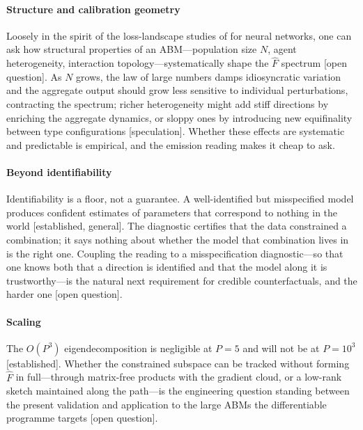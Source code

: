 \documentclass[10pt,twocolumn]{article}
\newcommand{\Fhat}{\hat{F}}
\newcommand{\est}[1]{\textup{\textsf{\footnotesize[#1]}}}
\begin{document}
\paragraph{Structure and calibration geometry}
Loosely in the spirit of the loss-landscape studies of \citet{li2018visualizing} for
neural networks, one can ask how structural properties of an ABM---population size
$N$, agent heterogeneity, interaction topology---systematically shape the $\Fhat$
spectrum \est{open question}. As $N$ grows, the law of large numbers damps
idiosyncratic variation and the aggregate output should grow less sensitive to
individual perturbations, contracting the spectrum; richer heterogeneity might add
stiff directions by enriching the aggregate dynamics, or sloppy ones by introducing
new equifinality between type configurations \est{speculation}. Whether these effects
are systematic and predictable is empirical, and the emission reading makes it cheap
to ask.

\paragraph{Beyond identifiability}
Identifiability is a floor, not a guarantee. A well-identified but misspecified model
produces confident estimates of parameters that correspond to nothing in the world
\est{established, general}. The diagnostic certifies that the data constrained a
combination; it says nothing about whether the model that combination lives in is the
right one. Coupling the reading to a misspecification diagnostic---so that one knows
both that a direction is identified and that the model along it is trustworthy---is
the natural next requirement for credible counterfactuals, and the harder one \est{open
question}.

\paragraph{Scaling}
The $O(P^3)$ eigendecomposition is negligible at $P=5$ and will not be at $P=10^3$
\est{established}. Whether the constrained subspace can be tracked without forming
$\Fhat$ in full---through matrix-free products with the gradient cloud, or a low-rank
sketch maintained along the path---is the engineering question standing between the
present validation and application to the large ABMs the differentiable programme
targets \est{open question}.

\appendix
\end{document}

